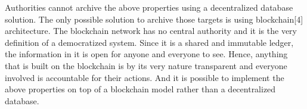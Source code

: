   Authorities cannot archive the above properties using a decentralized database solution. 
  The only possible solution to archive those targets is using blockchain[4] architecture. 
  The blockchain network has no central authority and it is the very definition of a 
  democratized system. Since it is a shared and immutable ledger, the information in it is 
  open for anyone and everyone to see. Hence, anything that is built on the blockchain is 
  by its very nature transparent and everyone involved is accountable for their actions. 
  And it is possible to implement the above properties on top of a blockchain model rather 
  than a decentralized database.


  




\clearpage



